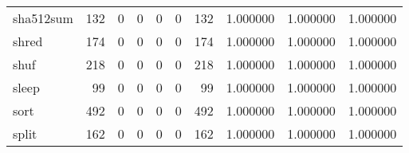 \begin{longtable}{lrrrrrrrrr}
sha512sum &                                                132 &                                                  0 &                                                  0 &                                                  0 &                                                  0 &                                                132 &                                           1.000000 &                               1.000000 &                             1.000000 \\
shred     &                                                174 &                                                  0 &                                                  0 &                                                  0 &                                                  0 &                                                174 &                                           1.000000 &                               1.000000 &                             1.000000 \\
shuf      &                                                218 &                                                  0 &                                                  0 &                                                  0 &                                                  0 &                                                218 &                                           1.000000 &                               1.000000 &                             1.000000 \\
sleep     &                                                 99 &                                                  0 &                                                  0 &                                                  0 &                                                  0 &                                                 99 &                                           1.000000 &                               1.000000 &                             1.000000 \\
sort      &                                                492 &                                                  0 &                                                  0 &                                                  0 &                                                  0 &                                                492 &                                           1.000000 &                               1.000000 &                             1.000000 \\
split     &                                                162 &                                                  0 &                                                  0 &                                                  0 &                                                  0 &                                                162 &                                           1.000000 &                               1.000000 &                             1.000000 \\

\end{longtable}
